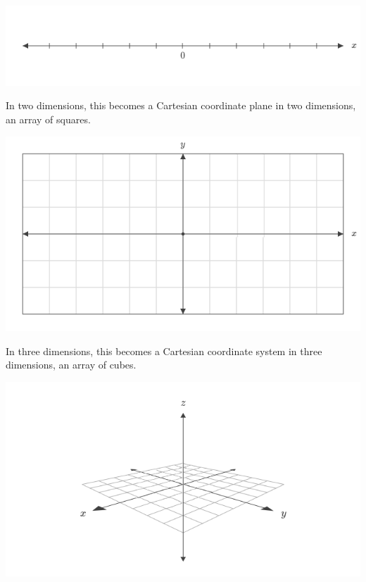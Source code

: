 \documentclass[10pt]{report}
\begin{document}
		\begin{minipage}{\textwidth}
			\centering
			\includegraphics[scale=.4]{1d}
			\label{fig:1d}
		\end{minipage}
	
		In two dimensions, this becomes a Cartesian coordinate plane in two dimensions, an array of squares.
	
		\begin{minipage}{\textwidth}
			\centering
			\includegraphics[scale=.35]{2d}
			\label{fig:2d}
		\end{minipage}
	
		In three dimensions, this becomes a Cartesian coordinate system in three dimensions, an array of cubes.
		
		\begin{minipage}{\textwidth}
			\centering
			\includegraphics[scale=.5]{3d}
			\label{fig:3d}
		\end{minipage}
	
\end{document}
